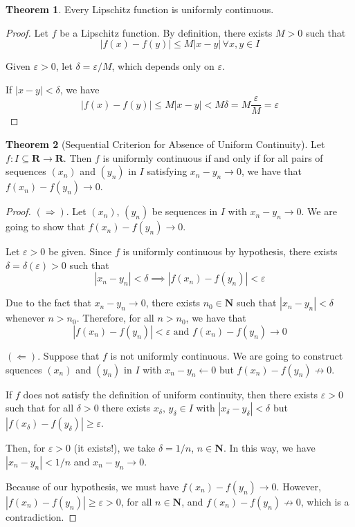 \documentclass[tikz,12pt,a4paper]{article}
\theoremstyle{definition}
\newtheorem{theorem}{Theorem}[section]
\begin{document}
\begin{theorem}
	Every Lipschitz function is uniformly continuous. 
\end{theorem}

\begin{proof}
	Let $f$ be a Lipschitz function. By definition, there exists $M > 0$ such that
	\[
		|f(x) - f(y) | \leq M |x-y| \, \forall x,y \in I
	\]
	
	Given $\varepsilon > 0$, let $\delta = \varepsilon/M$, which depends only on $\varepsilon$.
	
	If $|x-y| < \delta$, we have
	\[
		|f(x) - f(y) | \leq M |x-y| < M \delta = M \frac{\varepsilon}{M} = \varepsilon
	\]
\end{proof}

\begin{theorem}[Sequential Criterion for Absence of Uniform Continuity]
	Let $f : I \subseteq \textbf{R} \longrightarrow \textbf{R}$. Then $f$ is uniformly continuous if and only if for all pairs of sequences $(x_n)$ and $(y_n)$ in $I$ satisfying $x_n - y_n \longrightarrow 0$, we have that $f(x_n) - f(y_n) \longrightarrow 0$.
\end{theorem}

\begin{proof}
	$(\Rightarrow).$ Let $(x_n)$, $(y_n)$ be sequences in $I$ with $x_n - y_n \longrightarrow 0$. We are going to show that $f(x_n) - f(y_n) \longrightarrow 0$.
	
	Let $\varepsilon > 0$ be given. Since $f$ is uniformly continuous by hypothesis, there exists $\delta = \delta(\varepsilon) > 0$ such that
	\[
		|x_n - y_n| < \delta \implies |f(x_n) - f(y_n)| < \varepsilon
	\]
	
	Due to the fact that $x_n - y_n \longrightarrow 0$, there exists $n_0 \in \textbf{N}$ such that $|x_n - y_n| < \delta$ whenever $n > n_0$. Therefore, for all $n > n_0$, we have that 
	\[
		|f(x_n) - f(y_n)| < \varepsilon \text{ and } f(x_n) - f(y_n) \longrightarrow 0 
	\]
	
	$(\Leftarrow).$ Suppose that $f$ is not uniformly continuous. We are going to construct squences $(x_n)$ and $(y_n)$ in $I$ with $x_n - y_n \longleftarrow 0$ but $f(x_n) - f(y_n) \not\longrightarrow 0$.
	
	If $f$ does not satisfy the definition of uniform continuity, then there exists $\varepsilon > 0$ such that for all $\delta > 0$ there exists $x_\delta, \, y_\delta \in I$ with $| x_\delta - y_\delta | < \delta$ but $| f(x_\delta ) - f(y_\delta )| \geq \varepsilon$.
	
	Then, for $\varepsilon > 0$ (it exists!), we take $\delta = 1/n$, $n \in \textbf{N}$. In this way, we have $ |x_n - y_n| < 1/n$ and $x_n - y_n \longrightarrow 0$.
	
	Because of our hypothesis, we must have $f(x_n) - f(y_n) \longrightarrow 0$. However, $|f(x_n) - f(y_n)| \geq \varepsilon > 0$, for all $n \in \textbf{N}$, and $f(x_n) - f(y_n) \not\longrightarrow 0$, which is a contradiction.
\end{proof}
\end{document}
